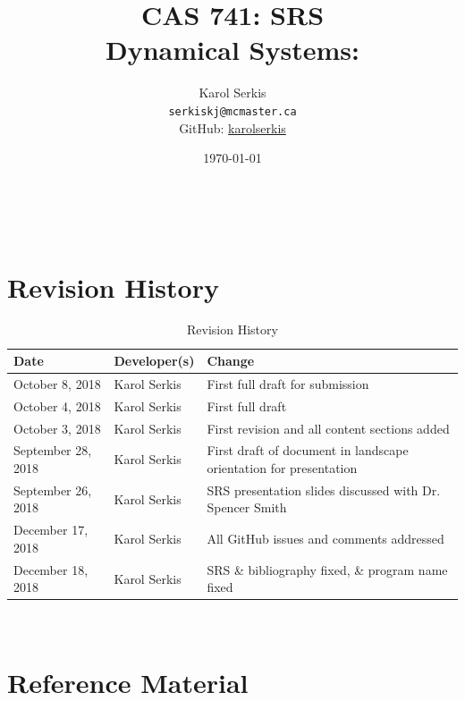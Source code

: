 \documentclass[12pt]{article}
\begin{document}

\title{CAS 741: SRS\\[10pt]\Large Dynamical Systems: \progname}
\author{Karol Serkis\\\texttt{serkiskj@mcmaster.ca}\\GitHub:
\href{https://www.github.com/karolserkis}{karolserkis}}
\date{\today}
	
\maketitle

~\newpage

\tableofcontents
\listoffigures

\clearpage

\setcounter{secnumdepth}{0}

\section{Revision History}

\begin{table}[hp]
\caption{Revision History}
\begin{tabularx}{\textwidth}{llX}
\toprule
\textbf{Date} & \textbf{Developer(s)} & \textbf{Change}\\
\midrule
October 8, 2018 & Karol Serkis &  First full draft for submission\\
October 4, 2018 & Karol Serkis &  First full draft\\
October 3, 2018 & Karol Serkis & First revision and all content sections added
\\September 28, 2018 & 
Karol Serkis & First draft of document in landscape
orientation for presentation\\
September 26, 2018 & Karol Serkis & SRS presentation slides discussed with Dr.
Spencer Smith \\
December 17, 2018 & Karol Serkis & All GitHub issues and comments addressed \\
December 18, 2018 & Karol Serkis & SRS \& bibliography fixed, 
\& program name fixed \\
\bottomrule
\end{tabularx}
\end{table}

~\newpage

\section{Reference Material}
\end{document}
